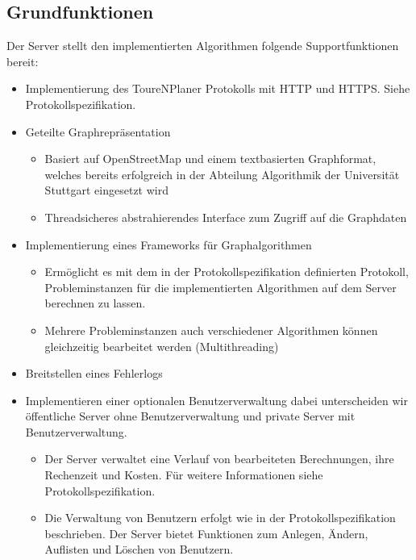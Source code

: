 \documentclass[a4paper,10pt,titlepage,parskip=true]{article}
\begin{document}
\subsection{Grundfunktionen}
Der Server stellt den implementierten Algorithmen folgende Supportfunktionen bereit:
\begin{itemize}

	\item Implementierung des ToureNPlaner Protokolls mit HTTP und HTTPS. Siehe Protokollspezifikation.

	\item Geteilte Graphrepräsentation
	\begin{itemize}
		\item Basiert auf OpenStreetMap und einem textbasierten Graphformat, welches bereits erfolgreich in der Abteilung Algorithmik der Universität Stuttgart eingesetzt wird
		\item Threadsicheres abstrahierendes Interface zum Zugriff auf die Graphdaten
	\end{itemize}

  \item Implementierung eines Frameworks für Graphalgorithmen
  \begin{itemize}
	\item Ermöglicht es mit dem in der Protokollspezifikation definierten Protokoll, Probleminstanzen für die implementierten Algorithmen auf dem Server berechnen zu lassen.
	\item Mehrere Probleminstanzen auch verschiedener Algorithmen können gleichzeitig bearbeitet werden (Multithreading)
  \end{itemize}

 \item Breitstellen eines Fehlerlogs

 \item Implementieren einer optionalen Benutzerverwaltung dabei unterscheiden wir öffentliche Server ohne Benutzerverwaltung und private Server mit Benutzerverwaltung.
 \begin{itemize}
	\item Der Server verwaltet eine Verlauf von bearbeiteten Berechnungen, ihre Rechenzeit und Kosten. Für weitere Informationen siehe Protokollspezifikation.
	\item Die Verwaltung von Benutzern erfolgt wie in der Protokollspezifikation beschrieben. Der Server bietet Funktionen zum Anlegen, Ändern, Auflisten und Löschen von Benutzern.
 \end{itemize}
\end{itemize}
\end{document}
